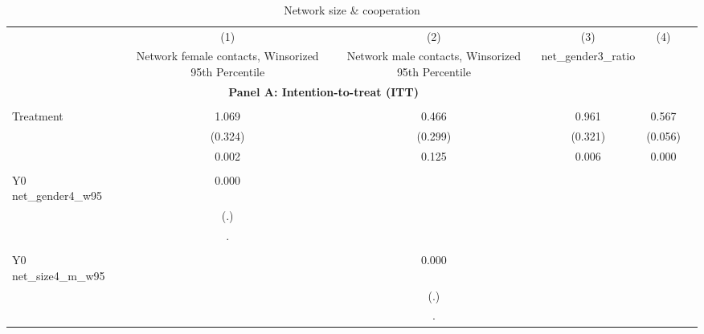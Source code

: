 \begin{table}[!h] \centering \\ \caption{Network size & cooperation} \\ \begin{adjustbox}{width=\columnwidth,center} \\ \begin{tabular}{l*{5}{c}} \hline\hline
                    &\multicolumn{1}{c}{(1)}         &\multicolumn{1}{c}{(2)}         &\multicolumn{1}{c}{(3)}         &\multicolumn{1}{c}{(4)}         \\
                    &Network female contacts, Winsorized 95th Percentile         &Network male contacts, Winsorized 95th Percentile         &net\_gender3\_ratio         &%
\hline \\ \multicolumn{4}{c}{\textbf{Panel A: Intention-to-treat (ITT)}} \\\\[-1ex]
Treatment           &       1.069\sym{***}&       0.466         &       0.961\sym{***}&       0.567\sym{***}\\
                    &     (0.324)         &     (0.299)         &     (0.321)         &     (0.056)         \\
                    &       0.002         &       0.125         &       0.006         &       0.000         \\
                    &                     &                     &                     &                     \\
Y0 net\_gender4\_w95  &       0.000         &                     &                     &                     \\
                    &         (.)         &                     &                     &                     \\
                    &           .         &                     &                     &                     \\
                    &                     &                     &                     &                     \\
Y0 net\_size4\_m\_w95  &                     &       0.000         &                     &                     \\
                    &                     &         (.)         &                     &                     \\
                    &                     &           .         &                     &                     \\

\end{tabular}
\end{adjustbox}
\end{table}
